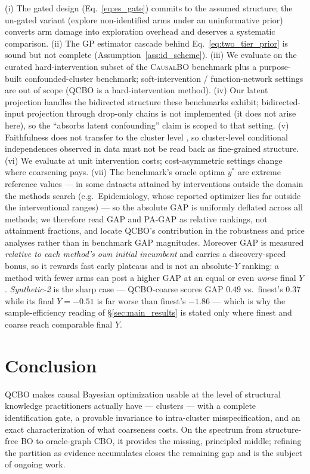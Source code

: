 \documentclass{article}
\newcommand{\QCBO}{\textsc{QCBO}}
\newcommand{\CBO}{\textsc{CBO}}
\newcommand{\BO}{\textsc{BO}}
\begin{document}
(i) The gated design (Eq.~\ref{eq:es_gate}) commits to the assumed
structure; the un-gated variant (explore non-identified arms under an
uninformative prior) converts arm damage into exploration overhead and
deserves a systematic comparison. (ii) The GP estimator cascade behind
Eq.~\eqref{eq:two_tier_prior} is sound but not complete
(Assumption~\ref{ass:id_scheme}). (iii) We evaluate on the curated
hard-intervention subset of the \textsc{CausalBO} benchmark plus a
purpose-built confounded-cluster benchmark; soft-intervention /
function-network settings are out of scope (\QCBO{} is a hard-intervention
method). (iv) Our latent projection handles the bidirected structure these
benchmarks exhibit; bidirected-input projection through drop-only chains is
not implemented (it does not arise here), so the ``absorbs latent
confounding'' claim is scoped to that setting. (v) Faithfulness does not
transfer to the cluster level \citep{wahl2024foundations}, so cluster-level
conditional independences observed in data must not be read back as
fine-grained structure. (vi) We evaluate at unit intervention costs;
cost-asymmetric settings change where coarsening pays. (vii) The benchmark's
oracle optima $y^*$ are extreme reference values --- in some datasets attained
by interventions outside the domain the methods search (e.g.\ Epidemiology,
whose reported optimizer lies far outside the interventional ranges) --- so the
absolute GAP is uniformly deflated across all methods; we therefore read GAP and
PA-GAP as relative rankings, not attainment fractions, and locate \QCBO{}'s
contribution in the robustness and price analyses rather than in benchmark GAP
magnitudes. Moreover GAP is measured \emph{relative to each method's own initial
incumbent} and carries a discovery-speed bonus, so it rewards fast early plateaus
and is not an absolute-$Y$ ranking: a method with fewer arms can post a higher GAP
at an equal or even \emph{worse} final $Y$. \emph{Synthetic-2} is the sharp case
--- \QCBO{}-coarse scores GAP $0.49$ vs.\ finest's $0.37$ while its final
$Y=-0.51$ is far worse than finest's $-1.86$ --- which is why the
sample-efficiency reading of \S\ref{sec:main_results} is stated only where finest
and coarse reach comparable final $Y$.

\section{Conclusion}
\label{sec:conclusion}

\QCBO{} makes causal Bayesian optimization usable at the level of
structural knowledge practitioners actually have --- clusters --- with a
complete identification gate, a provable invariance to intra-cluster
misspecification, and an exact characterization of what coarseness costs.
On the spectrum from structure-free \BO{} to oracle-graph \CBO{}, it
provides the missing, principled middle; refining the partition as
evidence accumulates closes the remaining gap and is the subject of
ongoing work.
\end{document}
